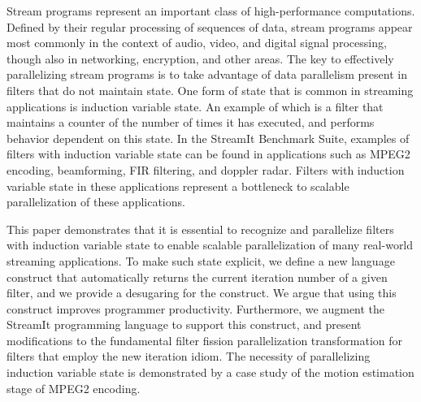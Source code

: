 Stream programs represent an important class of high-performance
computations. Defined by their regular processing of sequences of data,
stream programs appear most commonly in the context of audio, video,
and digital signal processing, though also in networking, encryption,
and other areas. The key to effectively parallelizing stream programs
is to take advantage of data parallelism present in filters that do
not maintain state.  One form of state that is common in streaming
applications is induction variable state.  An example of which is a
filter that maintains a counter of the number of times it has
executed, and performs behavior dependent on this state.  In the
StreamIt Benchmark Suite, examples of filters with induction variable
state can be found in applications such as MPEG2 encoding,
beamforming, FIR filtering, and doppler radar.  Filters with induction
variable state in these applications represent a bottleneck to
scalable parallelization of these applications.

This paper demonstrates that it is essential to recognize and
parallelize filters with induction variable state to enable scalable
parallelization of many real-world streaming applications.  To make
such state explicit, we define a new language construct that
automatically returns the current iteration number of a given filter,
and we provide a desugaring for the construct.  We argue that using this
construct improves programmer productivity.  Furthermore, we augment
the StreamIt programming language to support this construct, and
present modifications to the fundamental filter fission
parallelization transformation for filters that employ the new
iteration idiom.  The necessity of parallelizing induction variable
state is demonstrated by a case study of the motion estimation stage
of MPEG2 encoding.



